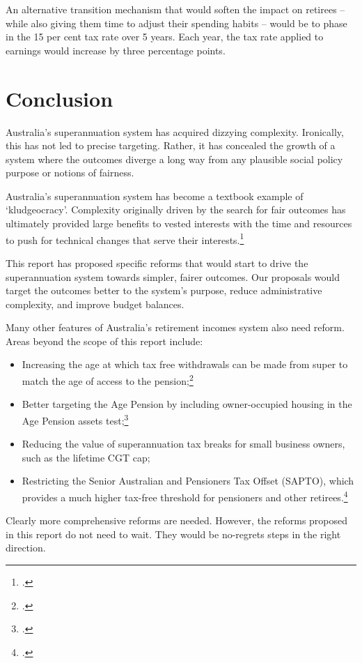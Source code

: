 An alternative transition mechanism that would soften the impact on retirees – while also giving them time to adjust their spending habits – would be to phase in the 15 per cent tax rate over 5 years. Each year, the tax rate applied to earnings would increase by three percentage points.

\chapter{Conclusion}
Australia’s superannuation system has acquired dizzying complexity. Ironically, this has not led to precise targeting. Rather, it has concealed the growth of a system where the outcomes diverge a long way from any plausible social policy purpose or notions of fairness.

Australia’s superannuation system has become a textbook example of ‘kludgeocracy’. Complexity originally driven by the search for fair outcomes has ultimately provided large benefits to vested interests with the time and resources to push for technical changes that serve their interests.\footcite{Teles2013} 

This report has proposed specific reforms that would start to drive the superannuation system towards simpler, fairer outcomes. Our proposals would target the outcomes better to the system’s purpose, reduce administrative complexity, and improve budget balances.

Many other features of Australia’s retirement incomes system also need reform. Areas beyond the scope of this report include: 
\begin{itemize}
\item	Increasing the age at which tax free withdrawals can be made from super to match the age of access to the pension;\footcite[][29]{DaleyMcGannonSavageEtAl2013BalancingBudgets} 
\item	Better targeting the Age Pension by including owner-occupied housing in the Age Pension assets test;\footcite[][37]{DaleyMcGannonSavageEtAl2013BalancingBudgets} 
\item	Reducing the value of superannuation tax breaks for small business owners, such as the lifetime CGT cap; 
\item	Restricting the Senior Australian and Pensioners Tax Offset (SAPTO), which provides a much higher tax-free threshold for pensioners and other retirees.\footcite{ACOSS2015--Sub-to-Govt-Retirement-Incomes-Review} 
\end{itemize} 
Clearly more comprehensive reforms are needed. However, the reforms proposed in this report do not need to wait. They would be no-regrets steps in the right direction. 





